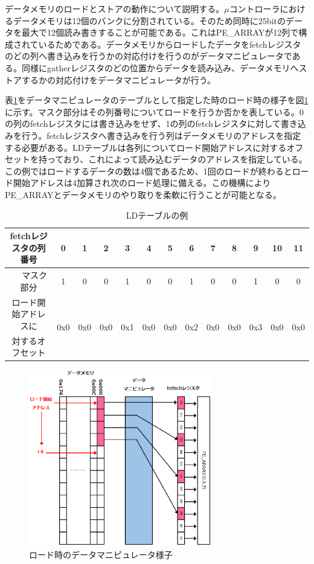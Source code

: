 {データメモリのロードとストアの動作について説明する。$\mu$コントローラにおけるデータメモリは12個のバンクに分割されている。そのため同時に25bitのデータを最大で12個読み書きすることが可能である。これはPE\_ARRAYが12列で構成されているためである。データメモリからロードしたデータをfetchレジスタのどの列へ書き込みを行うかの対応付けを行うのがデータマニピュレータである。同様にgatherレジスタのどの位置からデータを読み込み、データメモリへストアするかの対応付けをデータマニピュレータが行う。

表\ref{table:ldtbl}をデータマニピュレータのテーブルとして指定した時のロード時の様子を図\ref{fig:LD_dmanu}に示す。マスク部分はその列番号についてロードを行うか否かを表している。0の列のfetchレジスタには書き込みをせず、1の列のfetchレジスタに対して書き込みを行う。fetchレジスタへ書き込みを行う列はデータメモリのアドレスを指定する必要がある。LDテーブルは各列についてロード開始アドレスに対するオフセットを持っており、これによって読み込むデータのアドレスを指定している。この例ではロードするデータの数は4個であるため、1回のロードが終わるとロード開始アドレスは4加算され次のロード処理に備える。この機構によりPE\_ARRAYとデータメモリのやり取りを柔軟に行うことが可能となる。

\begin{table}[h]
\centering
\caption{LDテーブルの例}
\label{table:ldtbl}
\begin{tabular}{|c|c|c|c|c|c|c|c|c|c|c|c|c|} \hline
fetchレジスタの列番号 & 0 & 1 & 2 & 3 & 4 & 5 & 6 & 7 & 8 & 9 & 10 & 11 \\ \hline \hline　
マスク部分 & 1 & 0 & 0 & 1 & 0 & 0 & 1 & 0 & 0  & 1 & 0 & 0 \\ \hline
ロード開始アドレスに & \multirow{2}{*}{0x0} & \multirow{2}{*}{0x0} & \multirow{2}{*}{0x0} & \multirow{2}{*}{0x1} & \multirow{2}{*}{0x0} & \multirow{2}{*}{0x0} & \multirow{2}{*}{0x2} & \multirow{2}{*}{0x0} & \multirow{2}{*}{0x0} & \multirow{2}{*}{0x3} & \multirow{2}{*}{0x0} & \multirow{2}{*}{0x0} \\ 
対するオフセット & & & & & & & & & & & & \\ \hline
\end{tabular}
\end{table}

\begin{figure}[]
\centering
\includegraphics[width=8cm]{./chap4/fig/LD_dmanu.eps}
\caption{ロード時のデータマニピュレータ様子}
\label{fig:LD_dmanu}
\end{figure}


}
